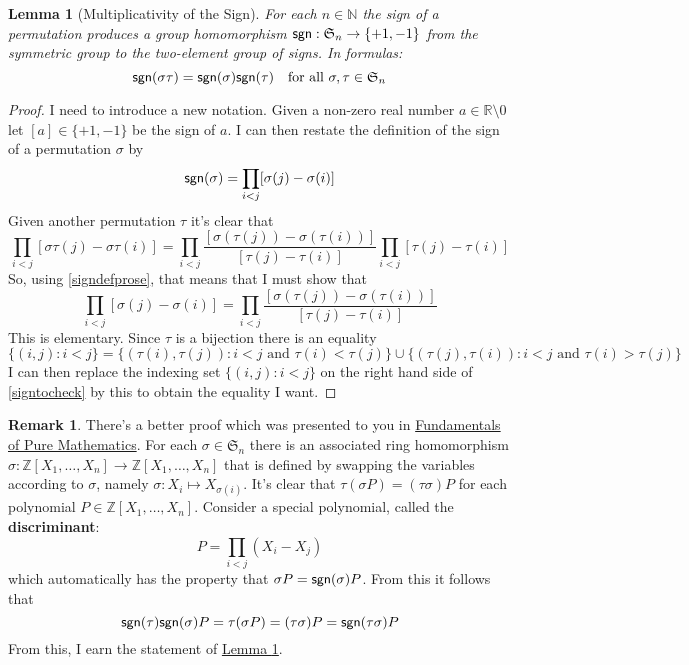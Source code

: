 \documentclass[11pt]{amsbook}
\newtheorem{lemma}[theorem]{Lemma}
\theoremstyle{definition}
\newtheorem{rem}[theorem]{Remark}
\begin{document}
\begin{lemma}[Multiplicativity of the Sign] \label{multsign} For each $n\in \mathbb{N}$ the sign of a permutation produces a group homomorphism ${\sf sgn}: \mathfrak{S}_n \to \{+1, -1\}$ from the symmetric group to the two-element group of signs. In formulas:
$${\sf sgn}(\sigma \tau) = {\sf sgn}(\sigma) {\sf sgn} (\tau) \quad \text{for all } \sigma, \tau \in \mathfrak{S}_n$$
\end{lemma}
\begin{proof} I need to introduce a new notation. Given a non-zero real number $a \in \mathbb{R}\setminus 0$ let $[a] \in \{+1,-1\}$ be the sign of $a$. I can then restate the definition of the sign of a permutation $\sigma$ by \begin{equation} \label{signdefprose} {\sf sgn} (\sigma) = \prod_{i< j} [\sigma(j)- \sigma(i)]\end{equation} Given another permutation $\tau$ it's clear that $$ \prod_{i< j} [\sigma\tau(j)- \sigma\tau(i)] = \prod_{i< j} \frac{[\sigma(\tau(j))- \sigma(\tau(i))]}{ [\tau(j)- \tau(i)]} \prod_{i< j} [\tau(j)- \tau(i)]$$ So, using \eqref{signdefprose}, that means that I must show that \begin{equation} \label{signtocheck} \prod_{i< j} [\sigma(j)- \sigma(i)] = \prod_{i< j} \frac{[\sigma(\tau(j))- \sigma(\tau(i))]}{ [\tau(j)- \tau(i)]}\end{equation} This is elementary. Since $\tau$ is a bijection there is an equality $$\{ (i,j): i< j \} = \{ (\tau(i), \tau(j)): i< j \text{ and } \tau (i) < \tau(j)  \} \cup \{ (\tau (j), \tau(i)): i< j \text{ and } \tau (i) > \tau(j) \}$$ I can then replace the indexing set $\{ (i,j) : i< j \}$ on the right hand side of \eqref{signtocheck} by this to obtain the equality I want.\end{proof}
\begin{rem}
There's a better proof which was presented to you in \href{http://www.drps.ed.ac.uk/12-13/dpt/cxmath08064.htm}{Fundamentals of Pure Mathematics}. For each $\sigma \in \mathfrak{S}_n$ there is an associated ring homomorphism $\sigma: \mathbb{Z}[X_1, \ldots , X_n] \to \mathbb{Z}[X_1, \ldots , X_n]$ that is defined by swapping the variables according to $\sigma$, namely $\sigma: X_i \mapsto X_{\sigma(i)}$. It's clear that $\tau (\sigma P ) = (\tau \sigma) P$ for each polynomial $P\in \mathbb{Z}[X_1, \ldots , X_n]$. Consider a special polynomial, called the {\bf discriminant}: $$P = \prod_{i<j} (X_i - X_j)$$ which automatically has the property that $\sigma P = {\sf sgn}(\sigma) P$. From this it follows  that $${\sf sgn}(\tau) {\sf sgn}(\sigma) P = \tau (\sigma P) = (\tau \sigma) P = {\sf sgn}(\tau \sigma) P$$ From this, I earn the statement of \hyperref[multsign]{Lemma \ref{multsign}}.
\end{rem}
\end{document}
